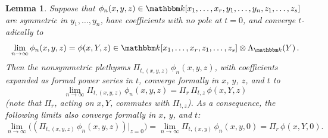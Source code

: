 \documentclass[12pt]{amsart}
\newtheorem{lemma}[thm]{Lemma}
\theoremstyle{definition}
\theoremstyle{remark}
\newcommand{\kk}{{\mathbbm k}}
\newcommand{\Pisf}{{\mathsf \Pi }}
\begin{document}
\begin{lemma}\label{lem:Pit-vs-Pir}
Suppose that $\phi _{n}(x,y,z)\in \kk[x_{1}, \ldots, x_{r}, y_{1},
\ldots, y_{n}, z_{1}, \ldots, z_{s}]$ are symmetric in $y_{1},
\ldots, y_{n}$, have coefficients
with no pole at $t=0$,
and converge $t$-adically to
\begin{equation}\label{e:lim-assumption}
\lim_{n\rightarrow \infty } \phi _{n}(x,y,z) = \phi (x,Y,z) \in
\kk[x_{1}, \ldots, x_{r}, z_{1}, \ldots, z_{s}]\otimes \Lambda
_{\kk }(Y)\, .
\end{equation}
Then the nonsymmetric plethysms $\Pi _{t,(x,y,z)}\, \phi _{n}(x,y,z)$,
with coefficients expanded as formal power series in $t$, converge
formally in $x$, $y$, $z$, and $t$ to
\begin{equation}\label{e:lim-conclusion-z}
\lim_{n\rightarrow \infty } \Pi _{t,(x,y,z)}\, \phi _{n}(x,y,z) =
\Pisf _{r} \, \Pi _{t,z}\, \phi (x,Y,z)
\end{equation}
(note that $\Pisf _{r}$, acting on $x,Y$, commutes with $\Pi _{t,z}$).
As a consequence, the following limits also converge formally in $x$,
$y$, and $t$:
\begin{equation}\label{e:lim-conclusions-0}
\lim_{n\rightarrow \infty } \bigl((\Pi _{t,(x,y,z)}\, \phi
_{n}(x,y,z))|_{z = 0}\bigr) = \lim_{n\rightarrow \infty } \Pi
_{t,(x,y)}\, \phi _{n}(x,y,0) = \Pisf _{r}\, \phi (x,Y,0).
\end{equation}
\end{lemma}
\end{document}
